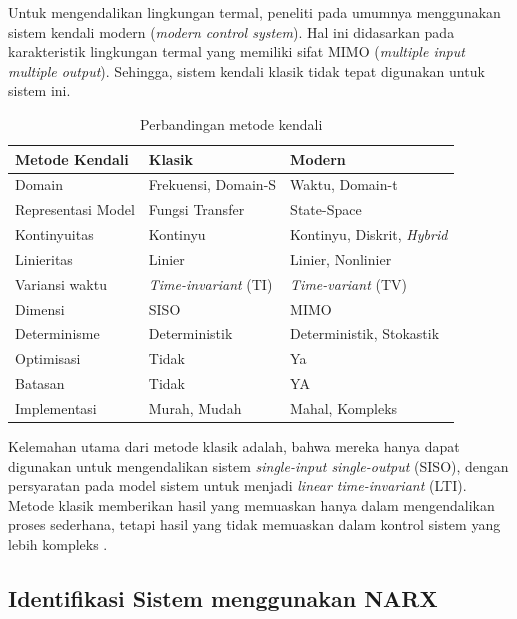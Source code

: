 Untuk mengendalikan lingkungan termal, peneliti pada umumnya menggunakan sistem kendali modern (\textit{modern control system}). Hal ini didasarkan pada karakteristik lingkungan termal yang memiliki sifat MIMO (\textit{multiple input multiple output}). Sehingga, sistem kendali klasik tidak tepat digunakan untuk sistem ini.
\begin{table}[!h]
	\caption{Perbandingan metode kendali}
	\label{tbl:3:whyann}
	\centering
	\begin{tabular}{|p{4cm}|p{4cm}|p{4.5cm}|}
		\hline
		\textbf{Metode Kendali} & \textbf{Klasik} & \textbf{Modern} \\ 
		\hline
		Domain & Frekuensi, Domain-S & Waktu, Domain-t \\ 
		\hline
		Representasi Model & Fungsi Transfer & State-Space \\ 
		\hline
		Kontinyuitas & Kontinyu & Kontinyu, Diskrit, \textit{Hybrid} \\ 
		\hline
		Linieritas & Linier & Linier, Nonlinier \\ 
		\hline
		Variansi waktu & \textit{Time-invariant} (TI) & \textit{Time-variant} (TV) \\ 
		\hline
		Dimensi & SISO & MIMO \\ 
		\hline
		Determinisme & Deterministik & Deterministik, Stokastik \\ 
		\hline
		Optimisasi & Tidak & Ya \\ 
		\hline
		Batasan & Tidak & YA \\ 
		\hline
		Implementasi & Murah, Mudah & Mahal, Kompleks \\ 
		\hline
	\end{tabular}
\end{table}

Kelemahan utama dari metode klasik adalah, bahwa mereka hanya dapat digunakan untuk mengendalikan sistem \textit{single-input single-output} (SISO), dengan persyaratan pada model sistem untuk menjadi \textit{linear time-invariant} (LTI). Metode klasik memberikan hasil yang memuaskan hanya dalam mengendalikan proses sederhana, tetapi hasil yang tidak memuaskan dalam kontrol sistem yang lebih kompleks \cite{MPCDissertation}. \\

\subsection{Identifikasi Sistem menggunakan NARX}

